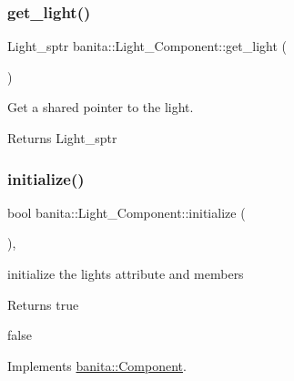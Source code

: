 \subsubsection{\texorpdfstring{get\_light()}{get\_light()}}
{\footnotesize\ttfamily Light\+\_\+sptr banita\+::\+Light\+\_\+\+Component\+::get\+\_\+light (\begin{DoxyParamCaption}{ }\end{DoxyParamCaption})\hspace{0.3cm}{\ttfamily [inline]}}



Get a shared pointer to the light. 

\begin{DoxyReturn}{Returns}
Light\+\_\+sptr 
\end{DoxyReturn}
\mbox{\label{classbanita_1_1_light___component_a2afec04726df91aee59837fa1481d361}} 
\subsubsection{\texorpdfstring{initialize()}{initialize()}}
{\footnotesize\ttfamily bool banita\+::\+Light\+\_\+\+Component\+::initialize (\begin{DoxyParamCaption}{ }\end{DoxyParamCaption})\hspace{0.3cm}{\ttfamily [override]}, {\ttfamily [virtual]}}



initialize the light\textquotesingle{}s attribute and members 

\begin{DoxyReturn}{Returns}
true 

false 
\end{DoxyReturn}


Implements \mbox{\hyperlink{classbanita_1_1_component_a2f700c071185f7033caa69576dafa9e7}{banita\+::\+Component}}.

\mbox{\label{classbanita_1_1_light___component_aa808026256f8f1050a1a90cc3b6a0602}} 
